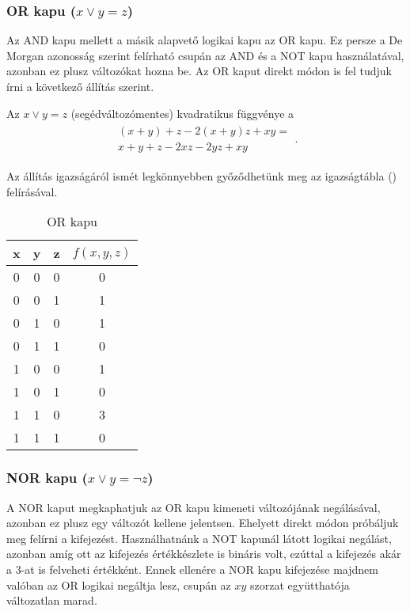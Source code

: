 \subsubsection{OR kapu ($x \vee y = z$)}

Az AND kapu mellett a másik alapvető logikai kapu az OR kapu. Ez persze a De Morgan azonosság szerint felírható csupán az AND és a NOT kapu használatával, azonban ez plusz változókat hozna be. Az OR kaput direkt módon is fel tudjuk írni a következő állítás szerint. 

\begin{allitas}
	Az $x \vee y = z$ (segédváltozómentes) kvadratikus függvénye a 
	\begin{align}
		\begin{split}
			(x+y)+z-2(x+y)z+xy = \\
			x+y+z-2xz-2yz+xy
		\end{split}.
	\end{align}

	Az állítás igazságáról ismét legkönnyebben győződhetünk meg az igazságtábla () felírásával.
\end{allitas}

	\begin{table}[ht]
	\footnotesize
	\centering
	\begin{tabular}{ c c c c }
		\toprule
		x & y & z & $f(x,y,z)$ \\
		\midrule
		0 & 0 & 0 & 0 \\
		0 & 0 & 1 & 1 \\
		0 & 1 & 0 & 1 \\
		0 & 1 & 1 & 0 \\
		1 & 0 & 0 & 1 \\
		1 & 0 & 1 & 0 \\
		1 & 1 & 0 & 3 \\
		1 & 1 & 1 & 0 \\		
		\bottomrule
	\end{tabular}
	\caption{OR kapu}
	\label{tab:ORgate}
\end{table}


\subsubsection{NOR kapu ($x \vee y = \neg z$)}

A NOR kaput megkaphatjuk az OR kapu kimeneti változójának negálásával, azonban ez plusz egy változót kellene jelentsen. Ehelyett direkt módon próbáljuk meg felírni a kifejezést. Használhatnánk a NOT kapunál látott logikai negálást, azonban amíg ott az kifejezés értékkészlete is bináris volt, ezúttal a kifejezés akár a $3$-at is felveheti értékként. Ennek ellenére a NOR kapu kifejezése majdnem valóban az OR logikai negáltja lesz, csupán az $xy$ szorzat együtthatója változatlan marad.

